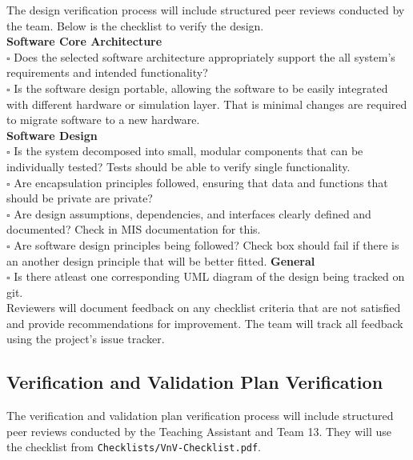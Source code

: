 \documentclass[12pt, titlepage]{article}
\begin{document}
The design verification process will include structured peer reviews conducted
by the team. Below is the checklist to verify the design.\\
\newline
\textbf{Software Core Architecture} \\
$\square$ Does the selected software architecture appropriately support the all
system's requirements and intended functionality? \\
$\square$ Is the software design portable, allowing the software to be easily
integrated with different hardware or simulation layer. That is minimal changes
are required to migrate software to a new hardware. \\
\newline
\newline
\textbf{Software Design} \\
$\square$ Is the system decomposed into small, modular components that can be
individually tested? Tests should be able to verify single functionality. \\
$\square$ Are encapsulation principles followed, ensuring that data and
functions that should be private are private? \\
$\square$ Are design assumptions, dependencies, and interfaces clearly defined
and documented? Check in MIS documentation \cite{MIS} for this. \\
$\square$ Are software design principles being followed? Check box should fail
if there is an another design principle that will be better fitted.
\newline
\newline
\textbf{General} \\
$\square$ Is there atleast one corresponding UML diagram of the design being
tracked on git. \\

Reviewers will document feedback on any checklist criteria that are not
satisfied and provide recommendations for improvement. The team will track all
feedback using the project's issue tracker.

\subsection{Verification and Validation Plan Verification}
\label{sec:vnv_plan_verification}

The verification and validation plan verification process will include
structured peer reviews conducted by the Teaching Assistant and Team 13. They
will use the checklist from \texttt{Checklists/VnV-Checklist.pdf}.
\end{document}
